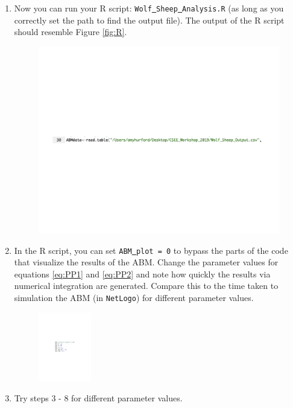 \documentclass[11pt, oneside]{article}   	%
\begin{document}
\begin{enumerate}
\begin{figure}[th!]
\begin{minipage}{.5\textwidth}
  \label{fig:test2}
\end{minipage}
\end{figure}
\FloatBarrier
\item Now you can run your R script: \texttt{Wolf\underline{ }Sheep\underline{ }Analysis.R} (as long as you correctly set the path to find the output file). The output of the R script should resemble Figure \ref{fig:R}.
\begin{figure}[!ht]
\includegraphics[height=.5cm]{path}
\end{figure}
\FloatBarrier

\item In the R script, you can set \texttt{ABM\underline{ }plot = 0} to bypass the parts of the code that visualize the results of the ABM. Change the parameter values for equations \ref{eq:PP1} and \ref{eq:PP2} and note how quickly the results via numerical integration are generated. Compare this to the time taken to simulation the ABM (in \texttt{NetLogo}) for different parameter values.

\begin{figure}[!ht]
\includegraphics[height=3cm]{parameters2}
\end{figure}
\FloatBarrier

\item Try steps 3 - 8 for different parameter values.

\end{enumerate}
\end{document}
